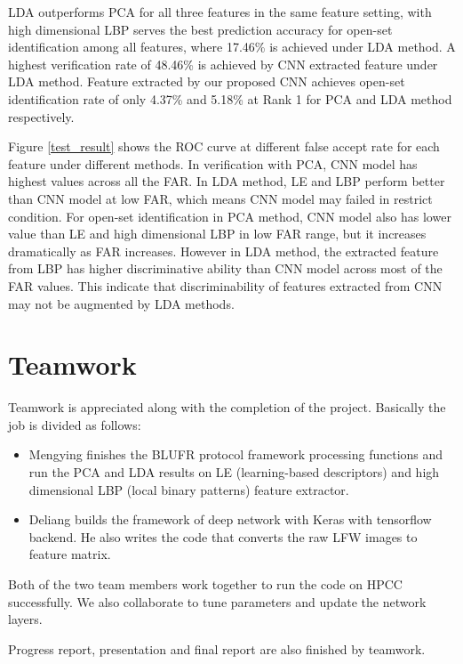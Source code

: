 \documentclass[conference]{IEEEtran}
\begin{document}
LDA outperforms PCA for all three features in the same feature setting, with high dimensional LBP serves the best prediction accuracy for open-set identification among all features, where 17.46\% is achieved under LDA method. A highest verification rate of 48.46\% is achieved by CNN extracted feature under LDA method. Feature extracted by our proposed CNN achieves open-set identification rate of only 4.37\% and 5.18\% at Rank 1 for PCA and LDA method respectively. 

Figure \ref{test_result} shows the ROC curve at different false accept rate for each feature under different methods. In verification with PCA, CNN model has highest values across all the FAR. In LDA method, LE and LBP perform better than CNN model at low FAR, which means CNN model may failed in restrict condition. For open-set identification in PCA method, CNN model also has lower value than LE and high dimensional LBP in low FAR range, but it increases dramatically as FAR increases. However in LDA method, the extracted feature from LBP has higher discriminative ability than CNN model across most of the FAR values. This indicate that discriminability of features extracted from CNN may not be augmented by LDA methods. 

\section{Teamwork}

Teamwork is appreciated along with the completion of the project. Basically the job is divided as follows:

\begin{itemize}
	\item Mengying finishes the BLUFR protocol framework processing functions and run the PCA and LDA results on LE (learning-based descriptors) and high dimensional LBP (local binary patterns) feature extractor. 
	
	\item Deliang builds the framework of deep network with Keras with tensorflow backend. He also writes the code that converts the raw LFW images to feature matrix. 
\end{itemize}


Both of the two team members work together to run the code on HPCC successfully. We also collaborate to tune parameters and update the network layers.

Progress report, presentation and final report are also finished by teamwork.
\end{document}

